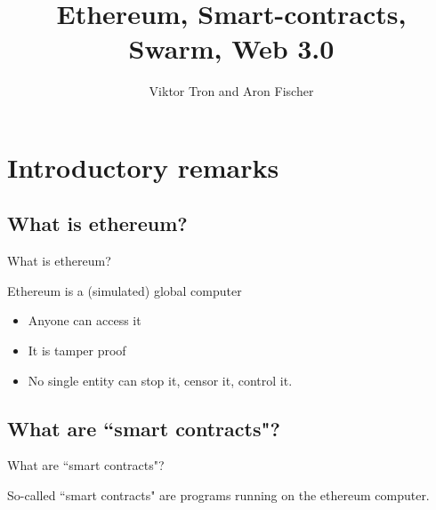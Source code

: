 \documentclass{beamer}
\title{Ethereum, Smart-contracts, Swarm, Web 3.0}
\author{Viktor Tron and Aron Fischer}
\begin{document}
 
\begin{frame}
 \titlepage
\end{frame}

\begin{frame}
 \tableofcontents[subsectionstyle=shaded/shaded,subsubsectionstyle=hide/hide]
\end{frame}


\section[intro]{Introductory remarks}

\subsection{What is ethereum?}
\begin{frame}{What is ethereum?}

Ethereum is a (simulated) global computer 
\begin{itemize}
 \item<2-> Anyone can access it
 \item<3-> It is tamper proof
 \item<4-> No single entity can stop it, censor it, control it.
\end{itemize}
\end{frame}

\subsection{What are ``smart contracts"?}

\begin{frame}{What are ``smart contracts"?}

So-called ``smart contracts" are programs running on the ethereum computer.
 
\end{frame}

\end{document}
